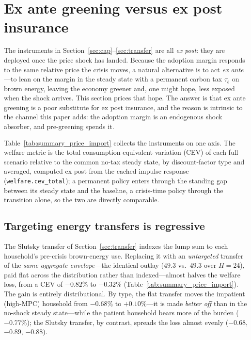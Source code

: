 \section{Ex ante greening versus ex post insurance}
\label{sec:exante}

The instruments in Section~\ref{sec:cap}--\ref{sec:transfer} are all
\emph{ex post}: they are deployed once the price shock has landed. Because the
adoption margin responds to the same relative price the crisis moves, a natural
alternative is to act \emph{ex ante}---to lean on the margin in the steady state
with a permanent carbon tax $\tau_b$ on brown energy, leaving the economy greener
and, one might hope, less exposed when the shock arrives. This section prices
that hope. The answer is that ex ante greening is a poor substitute for ex post
insurance, and the reason is intrinsic to the channel this paper adds: the
adoption margin is an endogenous shock absorber, and pre-greening spends it.

Table~\ref{tab:summary_price_import} collects the instruments on one axis. The
welfare metric is the total consumption-equivalent variation (CEV) of each full
scenario relative to the common no-tax steady state, by discount-factor type and
averaged, computed ex post from the cached impulse response
(\texttt{welfare.cev\_total}); a permanent policy enters through the standing gap
between its steady state and the baseline, a crisis-time policy through the
transition alone, so the two are directly comparable.



\subsection{Targeting energy transfers is regressive}
\label{sec:flat}

The Slutsky transfer of Section~\ref{sec:transfer} indexes the lump sum to each
household's pre-crisis brown-energy use. Replacing it with an
\emph{untargeted} transfer of the \emph{same aggregate envelope}---the identical
outlay ($49.3$ vs.\ $49.3$ over $H=24$), paid flat across the distribution rather
than indexed---almost halves the welfare loss, from a CEV of $-0.82\%$ to
$-0.32\%$ (Table~\ref{tab:summary_price_import}). The gain is entirely
distributional. By type, the flat transfer moves the impatient (high-MPC)
household from $-0.68\%$ to $+0.10\%$---it is made \emph{better off} than in the
no-shock steady state---while the patient household bears more of the burden
($-0.77\%$); the Slutsky transfer, by contrast, spreads the loss almost evenly
($-0.68$, $-0.89$, $-0.88$).

